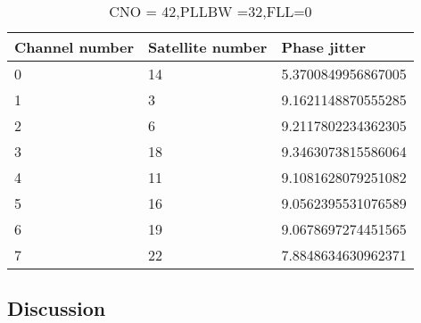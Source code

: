 \begin{table}[!htb]
\centering
\begin{tabular}{|l|l|l|}
\hline
\rowcolor[HTML]{C0C0C0} 
Channel number & Satellite number & Phase jitter       \\ \hline
0              & 14               & 5.3700849956867005 \\ \hline
\rowcolor[HTML]{EFEFEF} 
1              & 3                & 9.1621148870555285 \\ \hline
2              & 6                & 9.2117802234362305 \\ \hline
\rowcolor[HTML]{EFEFEF} 
3              & 18               & 9.3463073815586064 \\ \hline
4              & 11               & 9.1081628079251082 \\ \hline
\rowcolor[HTML]{EFEFEF} 
5              & 16               & 9.0562395531076589 \\ \hline
6              & 19               & 9.0678697274451565 \\ \hline
\rowcolor[HTML]{EFEFEF} 
7              & 22               & 7.8848634630962371 \\ \hline
\end{tabular}
\caption{CNO = 42,PLLBW =32,FLL=0}
\label{my-label}
\end{table}

\subsection{Discussion}




